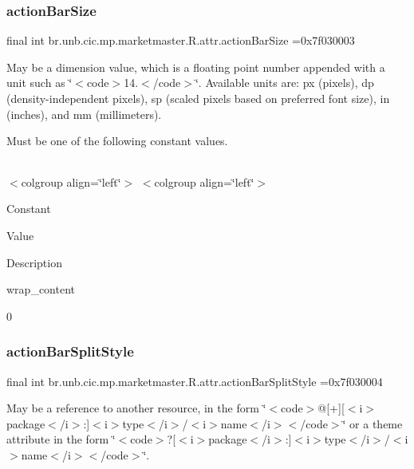 \subsubsection{\texorpdfstring{action\+Bar\+Size}{actionBarSize}}
{\footnotesize\ttfamily final int br.\+unb.\+cic.\+mp.\+marketmaster.\+R.\+attr.\+action\+Bar\+Size =0x7f030003\hspace{0.3cm}{\ttfamily [static]}}

May be a dimension value, which is a floating point number appended with a unit such as \char`\"{}$<$code$>$14.\+5sp$<$/code$>$\char`\"{}. Available units are\+: px (pixels), dp (density-\/independent pixels), sp (scaled pixels based on preferred font size), in (inches), and mm (millimeters). 

Must be one of the following constant values.

\tabulinesep=1mm
\begin{longtabu} spread 0pt [c]{*{0}{|X[-1]}|}
\hline
\end{longtabu}
$<$colgroup align=\char`\"{}left\char`\"{}$>$ $<$colgroup align=\char`\"{}left\char`\"{}$>$ 

Constant

Value

Description 

wrap\+\_\+content

0\mbox{\label{classbr_1_1unb_1_1cic_1_1mp_1_1marketmaster_1_1R_1_1attr_ab3c48d17585b3051f0250b02dd522bb3}} 
\subsubsection{\texorpdfstring{action\+Bar\+Split\+Style}{actionBarSplitStyle}}
{\footnotesize\ttfamily final int br.\+unb.\+cic.\+mp.\+marketmaster.\+R.\+attr.\+action\+Bar\+Split\+Style =0x7f030004\hspace{0.3cm}{\ttfamily [static]}}

May be a reference to another resource, in the form \char`\"{}$<$code$>$@\mbox{[}+\mbox{]}\mbox{[}$<$i$>$package$<$/i$>$\+:\mbox{]}$<$i$>$type$<$/i$>$/$<$i$>$name$<$/i$>$$<$/code$>$\char`\"{} or a theme attribute in the form \char`\"{}$<$code$>$?\mbox{[}$<$i$>$package$<$/i$>$\+:\mbox{]}$<$i$>$type$<$/i$>$/$<$i$>$name$<$/i$>$$<$/code$>$\char`\"{}. \mbox{\label{classbr_1_1unb_1_1cic_1_1mp_1_1marketmaster_1_1R_1_1attr_ab7bdeff81f3e62c2c34ba172cef6ef9e}} 
